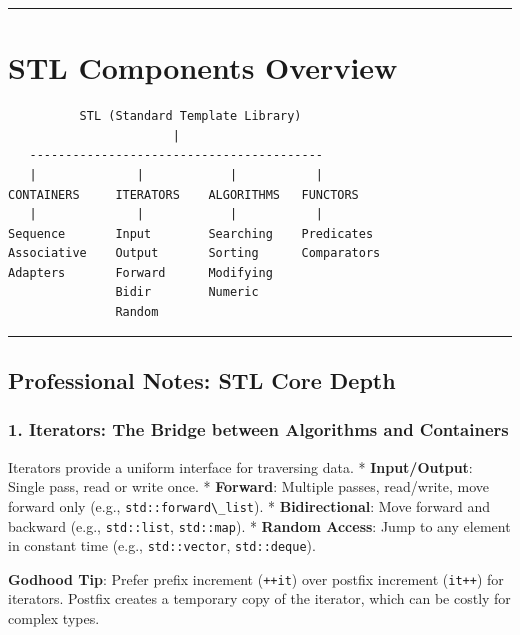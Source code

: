 \begin{center}\rule{0.5\linewidth}{0.5pt}\end{center}

\hypertarget{stl-components-overview}{%
\section{STL Components Overview}\label{stl-components-overview}}

\begin{lstlisting}
          STL (Standard Template Library)  
                       |
   -----------------------------------------
   |              |            |           |
CONTAINERS     ITERATORS    ALGORITHMS   FUNCTORS
   |              |            |           |
Sequence       Input        Searching    Predicates
Associative    Output       Sorting      Comparators
Adapters       Forward      Modifying      
               Bidir        Numeric      
               Random       
\end{lstlisting}

\begin{center}\rule{0.5\linewidth}{0.5pt}\end{center}

\hypertarget{professional-notes-stl-core-depth}{%
\subsection{Professional Notes: STL Core
Depth}\label{professional-notes-stl-core-depth}}

\hypertarget{iterators-the-bridge-between-algorithms-and-containers}{%
\subsubsection{1. Iterators: The Bridge between Algorithms and
Containers}\label{iterators-the-bridge-between-algorithms-and-containers}}

Iterators provide a uniform interface for traversing data. *
\textbf{Input/Output}: Single pass, read or write once. *
\textbf{Forward}: Multiple passes, read/write, move forward only (e.g.,
\passthrough{\lstinline!std::forward\_list!}). * \textbf{Bidirectional}:
Move forward and backward (e.g., \passthrough{\lstinline!std::list!},
\passthrough{\lstinline!std::map!}). * \textbf{Random Access}: Jump to
any element in constant time (e.g.,
\passthrough{\lstinline!std::vector!},
\passthrough{\lstinline!std::deque!}).

\textbf{Godhood Tip}: Prefer prefix increment
(\passthrough{\lstinline!++it!}) over postfix increment
(\passthrough{\lstinline!it++!}) for iterators. Postfix creates a
temporary copy of the iterator, which can be costly for complex types.

